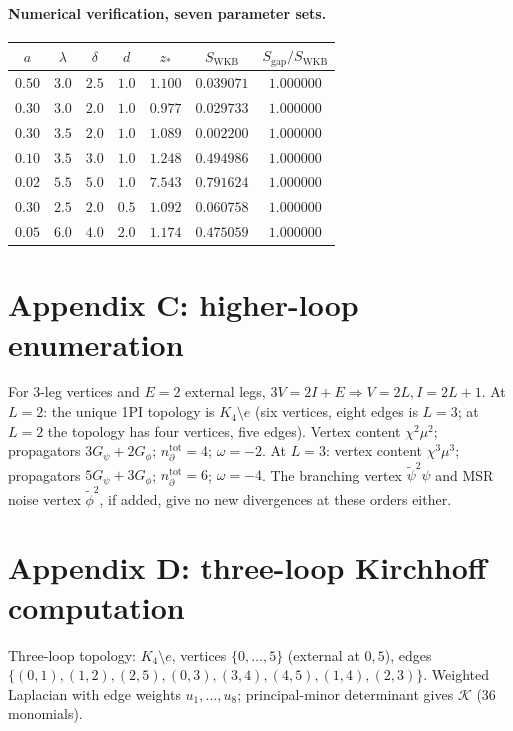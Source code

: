 \documentclass[11pt,a4paper]{article}
\newcommand{\psit}{\tilde\psi}
\newcommand{\phit}{\tilde\phi}
\theoremstyle{plain}
\begin{document}
\paragraph{Numerical verification, seven parameter sets.}
\begin{center}\small
\begin{tabular}{@{}ccccccc@{}}\toprule
$a$ & $\lambda$ & $\delta$ & $d$ & $z_*$ & $S_{\mathrm{WKB}}$
  & $S_{\mathrm{gap}}/S_{\mathrm{WKB}}$ \\ \midrule
$0.50$ & $3.0$ & $2.5$ & $1.0$ & $1.100$ & $0.039071$ & $1.000000$ \\
$0.30$ & $3.0$ & $2.0$ & $1.0$ & $0.977$ & $0.029733$ & $1.000000$ \\
$0.30$ & $3.5$ & $2.0$ & $1.0$ & $1.089$ & $0.002200$ & $1.000000$ \\
$0.10$ & $3.5$ & $3.0$ & $1.0$ & $1.248$ & $0.494986$ & $1.000000$ \\
$0.02$ & $5.5$ & $5.0$ & $1.0$ & $7.543$ & $0.791624$ & $1.000000$ \\
$0.30$ & $2.5$ & $2.0$ & $0.5$ & $1.092$ & $0.060758$ & $1.000000$ \\
$0.05$ & $6.0$ & $4.0$ & $2.0$ & $1.174$ & $0.475059$ & $1.000000$ \\
\bottomrule\end{tabular}
\end{center}

\section*{Appendix C: higher-loop enumeration}

For 3-leg vertices and $E = 2$ external legs,
$3V = 2I + E \Rightarrow V = 2L, I = 2L+1$.  At $L=2$: the
unique 1PI topology is $K_4 \setminus e$ (six vertices, eight
edges is $L=3$; at $L=2$ the topology has four vertices, five
edges).  Vertex content $\chi^2\mu^2$; propagators $3G_\psi +
2G_\phi$; $n_\partial^{\mathrm{tot}} = 4$; $\omega = -2$.
At $L=3$: vertex content $\chi^3\mu^3$; propagators
$5G_\psi + 3G_\phi$; $n_\partial^{\mathrm{tot}} = 6$;
$\omega = -4$.  The branching vertex $\psit^2\psi$ and MSR noise
vertex $\phit^2$, if added, give no new divergences at these
orders either.

\section*{Appendix D: three-loop Kirchhoff computation}

Three-loop topology: $K_4 \setminus e$, vertices
$\{0,\ldots,5\}$ (external at $0, 5$), edges
$\{(0,1),(1,2),(2,5),(0,3),(3,4),(4,5),(1,4),(2,3)\}$.  Weighted
Laplacian with edge weights $u_1,\ldots,u_8$; principal-minor
determinant gives $\mathcal{K}$ (36 monomials).
\end{document}
